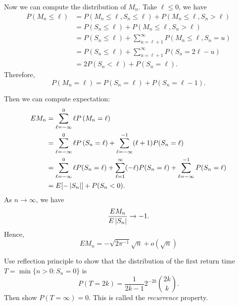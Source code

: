 \documentclass[a4paper]{article}
\begin{document}
\begin{eg}
  Now we can compute the distribution of $M_n$.
  Take $\ell \leq 0$, we have
  \begin{align*}
    P \left( M_n \leq \ell \right)
     & = P \left( M_n \leq \ell, S_n \leq \ell \right)
    + P \left( M_n \leq \ell , S_n > \ell \right)                              \\
     & = P \left( S_n \leq \ell \right)
    + P \left( M_n \leq \ell , S_n > \ell \right)                              \\
     & = P ( S_n \leq \ell )
    + \sum_{u = \ell + 1}^\infty P \left( M_n \leq \ell , S_n = u \right)      \\
     & = P ( S_n \leq \ell ) + \sum_{u = \ell + 1}^\infty P (S_n = 2 \ell - u) \\
     & = 2 P ( S_n < \ell ) + P (S_n = \ell).
  \end{align*}
  Therefore,
  \[
    P \left( M_n = \ell \right) = P(S_n = \ell) + P(S_n = \ell - 1).
  \]

  Then we can compute expectation:
  \begin{align*}
    E M_n
     & = \sum_{\ell = - \infty}^0 \ell P \left( M_n = \ell \right) \\
     & = \sum_{\ell = - \infty}^0 \ell P \left( S_n = \ell \right)
    + \sum_{\ell = - \infty}^{-1} (\ell + 1) P(S_n = \ell)         \\
     & = \sum_{\ell = - \infty}^{0} \ell P ( S_n = \ell )
    + \sum_{\ell = 1}^\infty (- \ell) P( S_n = \ell )
    + \sum_{\ell = - \infty}^{-1} P(S_n = \ell)                    \\
     & = E [- \left\lvert S_n\right\rvert] + P (S_n < 0).
  \end{align*}
  As $n \to \infty$, we have
  \[
    \frac{E M_n}{E \left\lvert S_n\right\rvert} \to -1.
  \]
  Hence,
  \[
    E M_n = - \sqrt{2 \pi^{-1}} \sqrt{n} + o( \sqrt{n} )
  \]
\end{eg}

\begin{ex}
  Use reflection principle to show that the distribution
  of the first return time $T = \min \{ n > 0: S_n = 0 \}$ is
  \[
    P(T = 2k) = \frac{1}{2 k - 1} 2^{-2 k} \binom{2k}{k}.
  \]
  Then show $P (T = \infty) = 0$. This is called the \emph{recurrence}
  property.
\end{ex}
\end{document}
